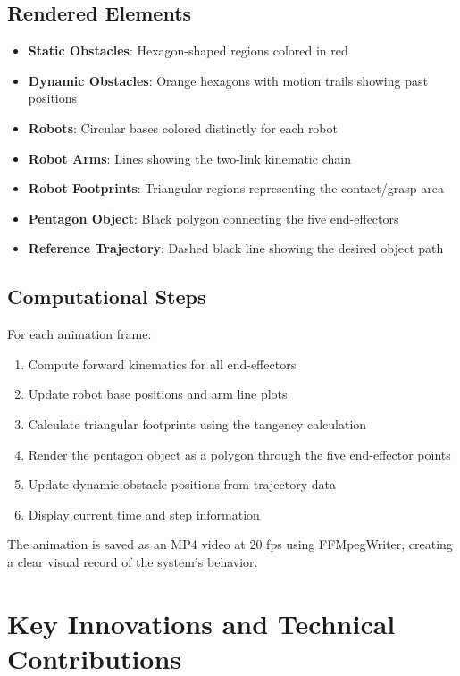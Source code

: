 \documentclass[12pt,a4paper]{article}
\begin{document}
\subsection{Rendered Elements}
\begin{itemize}
    \item \textbf{Static Obstacles}: Hexagon-shaped regions colored in red
    \item \textbf{Dynamic Obstacles}: Orange hexagons with motion trails showing past positions
    \item \textbf{Robots}: Circular bases colored distinctly for each robot
    \item \textbf{Robot Arms}: Lines showing the two-link kinematic chain
    \item \textbf{Robot Footprints}: Triangular regions representing the contact/grasp area
    \item \textbf{Pentagon Object}: Black polygon connecting the five end-effectors
    \item \textbf{Reference Trajectory}: Dashed black line showing the desired object path
\end{itemize}

\subsection{Computational Steps}
For each animation frame:

\begin{enumerate}
    \item Compute forward kinematics for all end-effectors
    \item Update robot base positions and arm line plots
    \item Calculate triangular footprints using the tangency calculation
    \item Render the pentagon object as a polygon through the five end-effector points
    \item Update dynamic obstacle positions from trajectory data
    \item Display current time and step information
\end{enumerate}

The animation is saved as an MP4 video at 20 fps using FFMpegWriter, creating a clear visual record of the system's behavior.

\section{Key Innovations and Technical Contributions}
\end{document}

